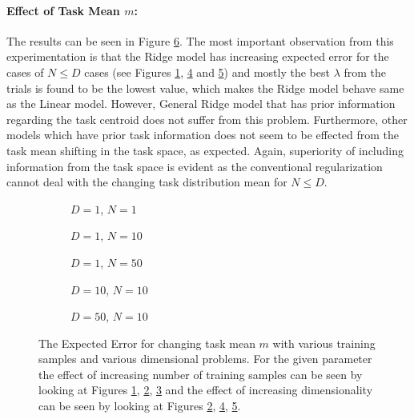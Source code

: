 \paragraph{Effect of Task Mean $m$:} The results can be seen in Figure \ref{fig:linear-m}. The most important observation from this experimentation is that the Ridge model has increasing expected error for the cases of $N\leq D$ cases (see Figures \ref{fig:linear-m-N-1-D-1}, \ref{fig:linear-m-N-10-D-10} and \ref{fig:linear-m-N-10-D-50}) and mostly the best $\lambda$ from the trials is found to be the lowest value, which makes the Ridge model behave same as the Linear model. However, General Ridge model that has prior information regarding the task centroid does not suffer from this problem. Furthermore, other models which have prior task information does not seem to be effected from the task mean shifting in the task space, as expected. Again, superiority of including information from the task space is evident as the conventional regularization cannot deal with the changing task distribution mean for $N\leq D$.

\begin{figure}[!h]
  \centering
    \begin{subfigure}{0.3\textwidth}
      \centering
      \caption{$D=1$, $N=1$}
      \label{fig:linear-m-N-1-D-1}
    \end{subfigure}
    \begin{subfigure}{0.3\textwidth}
      \centering
      \caption{$D=1$, $N=10$}
      \label{fig:linear-m-N-10-D-1}
    \end{subfigure}
    \begin{subfigure}{0.3\textwidth}
      \centering
      \caption{$D=1$, $N=50$}
      \label{fig:linear-m-N-50-D-1}
    \end{subfigure}

    \begin{subfigure}{0.3\textwidth}
      \centering
      \caption{$D=10$, $N=10$}
      \label{fig:linear-m-N-10-D-10}
    \end{subfigure}
    \begin{subfigure}{0.3\textwidth}
      \centering
      \caption{$D=50$, $N=10$}
      \label{fig:linear-m-N-10-D-50}
    \end{subfigure}  

  \caption{The Expected Error for changing task mean $m$ with various training samples and various dimensional problems. For the given parameter the effect of increasing number of training samples can be seen by looking at Figures \ref{fig:linear-m-N-1-D-1}, \ref{fig:linear-m-N-10-D-1}, \ref{fig:linear-m-N-50-D-1} and the effect of increasing dimensionality can be seen by looking at Figures \ref{fig:linear-m-N-10-D-1}, \ref{fig:linear-m-N-10-D-10}, \ref{fig:linear-m-N-10-D-50}.}\label{fig:linear-m}
\end{figure}

